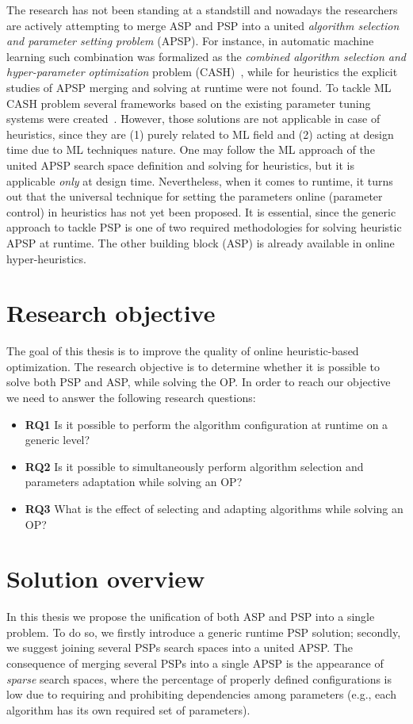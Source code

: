 The research has not been standing at a standstill and nowadays the researchers are actively attempting to merge ASP and PSP into a united \emph{algorithm selection and parameter setting problem} (APSP). For instance, in automatic machine learning such combination was formalized as the \emph{combined algorithm selection and hyper-parameter optimization} problem (CASH)~\cite{thornton2013auto}, while for heuristics the explicit studies of APSP merging and solving at runtime were not found. To tackle ML CASH problem several frameworks based on the existing parameter tuning systems were created~\cite{thornton2013auto,feurer2015efficient,olson2019tpot}. However, those solutions are not applicable in case of heuristics, since they are (1) purely related to ML field and (2) acting at design time due to ML techniques nature. One may follow the ML approach of the united APSP search space definition and solving for heuristics, but it is applicable \emph{only} at design time. Nevertheless, when it comes to runtime, it turns out that the universal technique for setting the parameters online (parameter control) in heuristics has not yet been proposed. It is essential, since the generic approach to tackle PSP is one of two required methodologies for solving heuristic APSP at runtime. The other building block (ASP) is already available in online hyper-heuristics.

\section{Research objective}\label{intro: research objective}
The goal of this thesis is to improve the quality of online heuristic-based optimization. The research objective is to determine whether it is possible to solve both PSP and ASP, while solving the OP. In order to reach our objective we need to answer the following research questions:
\begin{itemize}%
	\item \textbf{RQ1} Is it possible to perform the algorithm configuration at runtime on a generic level?
	\item \textbf{RQ2} Is it possible to simultaneously perform algorithm selection and parameters adaptation while solving an OP?
	\item \textbf{RQ3} What is the effect of selecting and adapting algorithms while solving an OP?
\end{itemize}

\section{Solution overview}
In this thesis we propose the unification of both ASP and PSP into a single problem. To do so, we firstly introduce a generic runtime PSP solution; secondly, we suggest joining several PSPs search spaces into a united APSP. The consequence of merging several PSPs into a single APSP is the appearance of \emph{sparse} search spaces, where the percentage of properly defined configurations is low due to requiring and prohibiting dependencies among parameters (e.g., each algorithm has its own required set of parameters).

